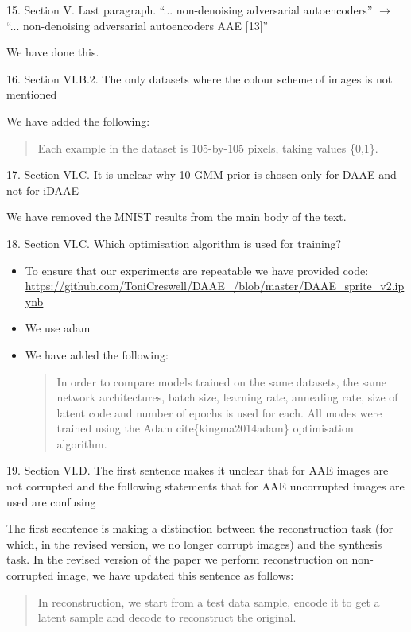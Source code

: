 \documentclass{article}
\begin{document}
{\color{blue}
15. Section V. Last paragraph. ``... non-denoising adversarial autoencoders'' $\rightarrow$ ``... non-denoising adversarial autoencoders AAE [13]''} \newline

We have done this.

{\color{blue}
16. Section VI.B.2. The only datasets where the colour scheme of images is not mentioned} \newline

We have added the following: 
\begin{quote}
     Each example in the dataset is $105$-by-$105$ pixels, taking values \{0,1\}. 
\end{quote}

{\color{blue}
17. Section VI.C. It is unclear why 10-GMM prior is chosen only for DAAE and not for iDAAE} \newline

{\color{red} We have removed the MNIST results from the main body of the text.}

{\color{blue}
18. Section VI.C. Which optimisation algorithm is used for training?}
\begin{itemize}
    \item To ensure that our experiments are repeatable we have provided code: \url{https://github.com/ToniCreswell/DAAE_/blob/master/DAAE_sprite_v2.ipynb}
    \item We use adam
    \item We have added the following:
    \begin{quote}
        In order to compare models trained on the same datasets, the same network architectures, batch size, learning rate, annealing rate, size of latent code and number of epochs is used for each. All modes were trained using the Adam cite\{kingma2014adam\} optimisation algorithm.
    \end{quote}
\end{itemize}

{\color{blue}
19. Section VI.D. The first sentence makes it unclear that for AAE images are not corrupted and the following statements that for AAE uncorrupted images are used are confusing\\
}

{\color{red}
The first secntence is making a distinction between the reconstruction task (for which, in the revised version, we no longer corrupt images) and the synthesis task. In the revised version of the paper we perform reconstruction on non-corrupted image, we have updated this sentence as follows:

\begin{quote}
In reconstruction, we start from a test data sample, encode it to get a latent sample and decode to reconstruct the original. 
\end{quote}
}
\end{document}
